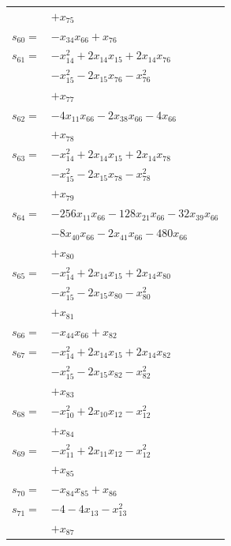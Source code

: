 \begin{longtable}{@{}r@{\;}l@{}}
 & \(\displaystyle +x_{75}\) \\[3pt]
\(s_{60}=\) & \(\displaystyle -x_{34}x_{66} +x_{76}\) \\[3pt]
\(s_{61}=\) & \(\displaystyle -x_{14}^{2} +2x_{14}x_{15} +2x_{14}x_{76}\) \\
 & \(\displaystyle -x_{15}^{2} -2x_{15}x_{76} -x_{76}^{2}\) \\
 & \(\displaystyle +x_{77}\) \\[3pt]
\(s_{62}=\) & \(\displaystyle -4x_{11}x_{66} -2x_{38}x_{66} -4x_{66}\) \\
 & \(\displaystyle +x_{78}\) \\[3pt]
\(s_{63}=\) & \(\displaystyle -x_{14}^{2} +2x_{14}x_{15} +2x_{14}x_{78}\) \\
 & \(\displaystyle -x_{15}^{2} -2x_{15}x_{78} -x_{78}^{2}\) \\
 & \(\displaystyle +x_{79}\) \\[3pt]
\(s_{64}=\) & \(\displaystyle -256x_{11}x_{66} -128x_{21}x_{66} -32x_{39}x_{66}\) \\
 & \(\displaystyle -8x_{40}x_{66} -2x_{41}x_{66} -480x_{66}\) \\
 & \(\displaystyle +x_{80}\) \\[3pt]
\(s_{65}=\) & \(\displaystyle -x_{14}^{2} +2x_{14}x_{15} +2x_{14}x_{80}\) \\
 & \(\displaystyle -x_{15}^{2} -2x_{15}x_{80} -x_{80}^{2}\) \\
 & \(\displaystyle +x_{81}\) \\[3pt]
\(s_{66}=\) & \(\displaystyle -x_{44}x_{66} +x_{82}\) \\[3pt]
\(s_{67}=\) & \(\displaystyle -x_{14}^{2} +2x_{14}x_{15} +2x_{14}x_{82}\) \\
 & \(\displaystyle -x_{15}^{2} -2x_{15}x_{82} -x_{82}^{2}\) \\
 & \(\displaystyle +x_{83}\) \\[3pt]
\(s_{68}=\) & \(\displaystyle -x_{10}^{2} +2x_{10}x_{12} -x_{12}^{2}\) \\
 & \(\displaystyle +x_{84}\) \\[3pt]
\(s_{69}=\) & \(\displaystyle -x_{11}^{2} +2x_{11}x_{12} -x_{12}^{2}\) \\
 & \(\displaystyle +x_{85}\) \\[3pt]
\(s_{70}=\) & \(\displaystyle -x_{84}x_{85} +x_{86}\) \\[3pt]
\(s_{71}=\) & \(\displaystyle -4 -4x_{13} -x_{13}^{2}\) \\
 & \(\displaystyle +x_{87}\) \\[3pt]

\end{longtable}

